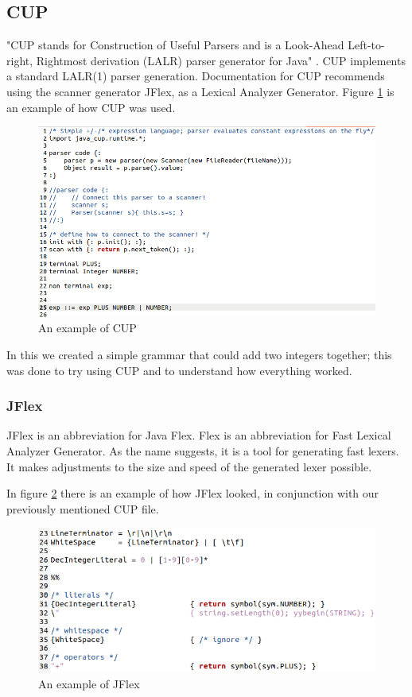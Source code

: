 \subsection{CUP}
"CUP stands for Construction of Useful Parsers and is a Look-Ahead Left-to-right, Rightmost derivation (LALR) parser generator for Java" \cite{cupParserGenerator}. CUP implements a standard LALR(1) parser generation. Documentation for CUP recommends using the scanner generator JFlex, as a Lexical Analyzer Generator. Figure \ref{fig:cup_example} is an example of how CUP was used.


\begin{figure}[htb!]
    \centering
    \includegraphics[scale = 0.5]{figures/Cup_Example.png}
    \caption{An example of CUP}
    \label{fig:cup_example}
\end{figure}

In this we created a simple grammar that could add two integers together; this was done to try using CUP and to understand how everything worked.


\subsubsection{JFlex}
JFlex is an abbreviation for Java Flex. Flex is an abbreviation for Fast Lexical Analyzer Generator. As the name suggests, it is a tool for generating fast lexers. It makes adjustments to the size and speed of the generated lexer possible. 

In figure \ref{fig:JFlex_example} there is an example of how JFlex looked, in conjunction with our previously mentioned CUP file. 

\begin{figure}[htb!]
    \centering
    \includegraphics[scale = 0.5]{figures/JFlex_Example.png}
    \caption{An example of JFlex}
    \label{fig:JFlex_example}
\end{figure}

